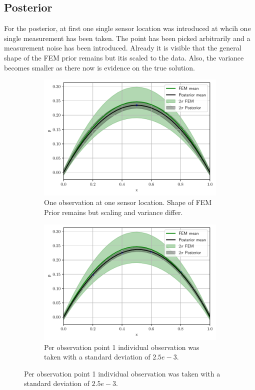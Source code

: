 \documentclass[%
  a4paper,oneside,%
  11pt,%
  smallchapters,
  style=printdev,
  extramargin,
  green,%
  rgb, <cmyk>
  ]{tubsbook}
\begin{document}
\subsection{Posterior}
For the posterior, at first one single sensor location was introduced at whcih one single measurement has been taken. The point has been picked arbitrarily and a measurement noise has been introduced. Already it is visible that the general shape of the FEM prior remains but itis scaled to the data. Also, the variance becomes smaller as there now is evidence on the true solution.
%
\begin{figure}[!ht]

\centering

	\begin{subfigure}[t]{.5\textwidth}
	\centering
	\includegraphics[width=1\linewidth]{pics/1DPost_1P1O.pdf}
	\caption{One observation at one sensor location. Shape of FEM Prior remains but scaling and variance differ.}	
	\label{fig:OneSensor}
	\end{subfigure}%
	\begin{subfigure}[t]{.5\textwidth}
	\centering
	\includegraphics[width=1\linewidth]{pics/1DPost_4P1O.pdf}
	\caption{Per observation point 1 individual observation was taken with a standard deviation of $2.5e-3$. }	
	\label{fig:4p10}
	\end{subfigure}
	

\end{figure}
\end{document}
